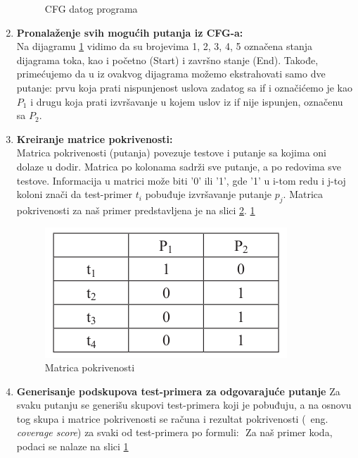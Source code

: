 \documentclass[a4paper]{article}
\theoremstyle{definition}
\begin{document}
\begin{enumerate}
\begin{figure}[h!]
\begin{center}
        \end{center}
        \caption{CFG datog programa}
        \label{fig:CFG}
        \end{figure}
    \item \textbf{Pronalaženje svih mogućih putanja iz CFG-a:}\\
        Na dijagramu \ref{fig:CFG} vidimo da su brojevima 1, 2, 3, 4, 5 označena stanja dijagrama toka, kao i početno (Start) i završno stanje (End). Takođe, primećujemo da u iz ovakvog dijagrama možemo ekstrahovati samo dve putanje: prvu koja prati nispunjenost uslova zadatog sa if i označićemo je kao $P_1$ i drugu koja prati izvršavanje u kojem uslov iz if nije ispunjen, označenu sa $P_2$.
    \item \textbf{Kreiranje matrice pokrivenosti:} \\
        Matrica pokrivenosti (putanja) povezuje testove i putanje sa kojima oni dolaze u dodir. Matrica po kolonama sadrži sve putanje, a po redovima sve testove. Informacija u matrici može biti '0' ili '1', gde '1' u i-tom redu i j-toj koloni znači da test-primer $t_i$ pobuđuje izvršavanje putanje $p_j$. Matrica pokrivenosti za naš primer predstavljena je na slici \ref{fig:pokrivenost}.
        \ref{fig:CFG}
        \begin{figure}[h!]
        \begin{center}
        \includegraphics[scale=0.25]{Coverage.png}
        \end{center}
        \caption{Matrica pokrivenosti}
        \label{fig:pokrivenost}
        \end{figure}
    \item \textbf{Generisanje podskupova test-primera za odgovarajuće putanje}
    Za svaku putanju se generišu skupovi test-primera koji je pobuđuju, a na osnovu tog skupa i matrice pokrivenosti se računa i rezultat pokrivenosti (~eng. \textit{coverage score}) za svaki od test-primera po formuli: $ $
    Za naš primer koda, podaci se nalaze na slici
    \ref{fig:CFG}
        \begin{figure}[h!]

\end{figure}
\end{enumerate}
\end{document}
